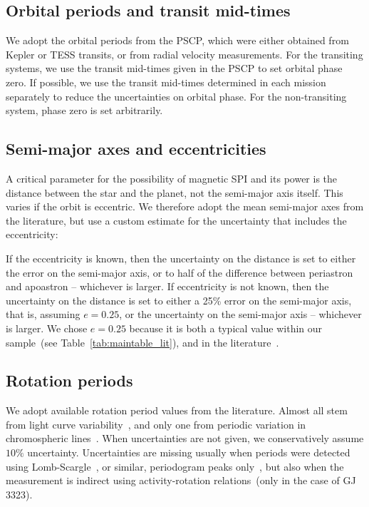 \documentclass[twocolumn]{aastex631}
\begin{document}
\subsection{Orbital periods and transit mid-times}
\label{sec:data:orbitalperiod}
We adopt the orbital periods from the PSCP, which were either obtained from Kepler or TESS transits, or from radial velocity measurements. For the transiting systems, we use the transit mid-times given in the PSCP to set orbital phase zero. If possible, we use the transit mid-times determined in each mission separately to reduce the uncertainties on orbital phase. For the non-transiting system, phase zero is set arbitrarily.
\subsection{Semi-major axes and eccentricities}
\label{sec:data:a}
A critical parameter for the possibility of magnetic SPI and its power is the distance between the star and the planet, not the semi-major axis itself. This varies if the orbit is eccentric. We therefore adopt the mean semi-major axes from the literature, but use a custom estimate for the uncertainty that includes the eccentricity:

If the eccentricity is known, then the uncertainty on the distance is set to either the error on the semi-major axis, or to half of the difference between periastron and apoastron -- whichever is larger. If eccentricity is not known, then the uncertainty on the distance is set to either a 25\% error on the semi-major axis, that is, assuming $e=0.25$, or the uncertainty on the semi-major axis -- whichever is larger. We chose $e=0.25$ because it is both a typical value within our sample~(see Table~\ref{tab:maintable_lit}), and in the literature~\citep{eylen2019orbital}.

\subsection{Rotation periods}
\label{sec:data:rotationperiods}
We adopt available rotation period values from the literature. Almost all stem from light curve variability~\citep{angus2018inferring, mazeh2015photometric, mcquillan2013stellar, mcquillan2014rotation, luger2017sevenplanet, stock2020carmenes, deleon202137, torres2017validation, stefansson2020habitable, zicher2022one, ment2021toi, rizzuto2020tess, gunther2020stellar}, and only one from periodic variation in chromospheric lines~\citep{demangeon2021warm}. When uncertainties are not given, we conservatively assume $10\%$ uncertainty. Uncertainties are missing usually when periods were detected using Lomb-Scargle~\citep{lomb1976leastsquares, scargle1982studies}, or similar, periodogram peaks only~\citep{gunther2020stellar, kiraga2007agerotationactivity, grankin2013magnetically, burt2014lickcarnegie}, but also when the measurement is indirect using activity-rotation relations~(only in the case of GJ 3323).
\end{document}
